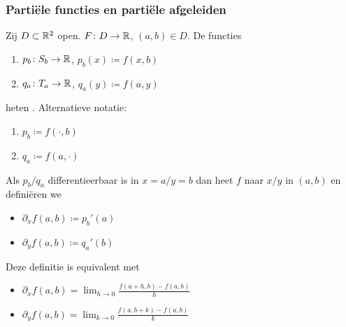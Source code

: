 \documentclass{2wa40summary}
\begin{document}
	\subsubsection{Parti\"ele functies en parti\"ele afgeleiden}
	
	\begin{define}
		Zij $D \subset \mathbb{R}^2$ open. $F\colon D \to \mathbb{R}$, $(a,b) \in D$.
		De functies
		\begin{enumerate}
			\item $p_b\colon S_b \to \mathbb{R}$, $p_b(x)\coloneqq f(x,b)$
			\item $q_a\colon T_a \to \mathbb{R}$, $q_a(y)\coloneqq f(a,y)$
		\end{enumerate}
		heten .
		Alternatieve notatie:
		\begin{enumerate}
			\item $p_b\coloneqq f(\cdot, b)$
			\item $q_a\coloneqq f(a,\cdot)$
		\end{enumerate}
		
	\end{define}
	
	\begin{define}
		Als $p_b/q_a$ differentieerbaar is in $x=a/y=b$ dan heet $f$  naar $x/y$ in $(a,b)$
		en defini\"eren we
		\begin{itemize}
			\item $\partial_x f(a,b) \coloneqq  p_b'(a)$
			\item $\partial_y f(a,b) \coloneqq  q_a'(b) $
		\end{itemize}
		
	\end{define}
	
	\begin{gevolg}
		
		Deze definitie is equivalent met
		\begin{itemize}
			\item $\displaystyle\partial_x f(a,b)=\lim_{h \to 0} \frac{f(a+h,b)-f(a,b)}{h}$
			\item $\displaystyle\partial_y f(a,b)=\lim_{k \to 0} \frac{f(a,b+k)-f(a,b)}{k}$
		\end{itemize}
		
	\end{gevolg}
	
\end{document}
